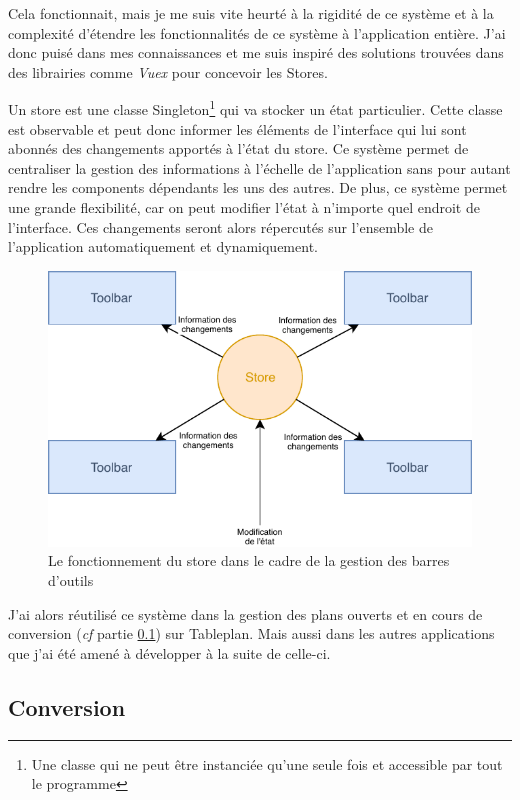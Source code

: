 Cela fonctionnait, mais je me suis vite heurté à la rigidité de ce système et à la complexité d'étendre les fonctionnalités de ce système à l'application entière.
J'ai donc puisé dans mes connaissances et me suis inspiré des solutions trouvées dans des librairies comme \emph{Vuex} pour concevoir les Stores.

Un store est une classe Singleton\footnote{Une classe qui ne peut être instanciée qu'une seule fois et accessible par tout le programme}  qui va stocker un état particulier.
Cette classe est observable et peut donc informer les éléments de l'interface qui lui sont abonnés des changements apportés à l'état du store.
Ce système permet de centraliser la gestion des informations à l'échelle de l'application sans pour autant rendre les components dépendants les uns des autres.
De plus, ce système permet une grande flexibilité, car on peut modifier l'état à n'importe quel endroit de l'interface.
Ces changements seront alors répercutés sur l'ensemble de l'application automatiquement et dynamiquement.

\begin{figure}[h]
    \centering
    \includegraphics[scale=1.5]{img/store.pdf}
    \caption{Le fonctionnement du store dans le cadre de la gestion des barres d'outils}
\end{figure}

J'ai alors réutilisé ce système dans la gestion des plans ouverts et en cours de conversion (\emph{cf} partie \ref{eiffageTablePlanConversion}) sur Tableplan.
Mais aussi dans les autres applications que j'ai été amené à développer à la suite de celle-ci.

\subsection{Conversion}
\label{eiffageTablePlanConversion}

